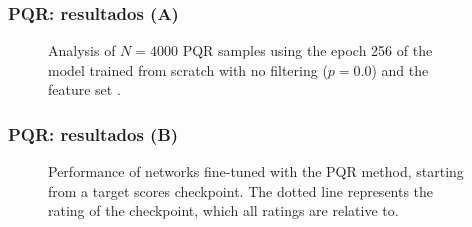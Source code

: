 \begin{frame}
\frametitle{PQR: resultados (A)}
\begin{figure}[H]
\centering
{}
\caption{Analysis of $N=4000$ PQR samples using the epoch 256 of the model trained from scratch with no filtering ($p=0.0$) and the feature set .}
\end{figure}
\end{frame}

\begin{frame}
\frametitle{PQR: resultados (B)}
\begin{figure}[H]
\centering
{}
\caption{Performance of networks fine-tuned with the PQR method, starting from a target scores checkpoint. The dotted line represents the rating of the checkpoint, which all ratings are relative to.}
\end{figure}
\end{frame}

